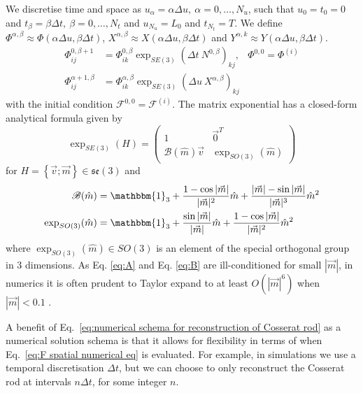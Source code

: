 \documentclass[withindex,glossary,techreport]{cam-thesis}
\begin{document}
\begin{appendices}
We discretise time and space as $u_{\alpha}=\alpha\Delta u,\ \alpha=0,\dots,N_{u}$, such that $u_{0}=t_{0}=0$ and $t_{\beta}=\beta\Delta t,\ \beta=0,\dots,N_{t}$
and $u_{N_{u}}=L_{0}$ and $t_{N_{t}}=T$. We define $\Phi^{\alpha,\beta}\approx \Phi(\alpha\Delta u,\beta\Delta t)$,
$X^{\alpha,\beta}\approx X(\alpha\Delta u,\beta\Delta t)$ and $Y^{\alpha,k}\approx Y(\alpha\Delta u,\beta\Delta t)$.
\begin{subequations} \label{eq:numerical schema for reconstruction of Cosserat rod}
\begin{align}
\Phi_{ij}^{0, \beta+1} & = \Phi_{ik}^{0, \beta} \exp_{SE(3)} \left(\Delta t\ N^{0, \beta}\right)_{kj}, & \Phi^{0,0}=\Phi^{(i)}\\
\Phi_{ij}^{\alpha+1, \beta} & = \Phi_{ik}^{\alpha, \beta}\exp_{SE(3)}  \left(\Delta u\ X^{\alpha,\beta}\right)_{kj} \label{eq:F spatial numerical eq}
\end{align}
\end{subequations}
with the initial condition $\mathcal{F}^{0,0}=\mathcal{F}^{(i)}$.
The matrix exponential has a closed-form analytical formula given
by
\begin{equation}
\exp_{SE(3)}  (H)=\left(\begin{array}{cc}
1 & \vec{0}^{T}\\
\mathscr{B}(\hat{m}) \vec{v} & \exp_{SO(3)}(\hat{m})
\end{array}\right)
\end{equation}
for $H=\left\{ \vec{v};\vec{m}\right\} \in\mathfrak{se}(3)$ and
\begin{subequations} 
\begin{align}
\mathscr{B}(\hat{m}) & =\mathbbm{1}_{3}+\frac{1-\cos|\vec{m}|}{|\vec{m}|^{2}}\hat{m}+\frac{|\vec{m}|-\sin|\vec{m}|}{|\vec{m}|^{3}}\hat{m}^{2}\label{eq:A}\\
\exp_{SO(3)} (\hat{m}) & =\mathbbm{1}_{3}+\frac{\sin|\vec{m}|}{|\vec{m}|}\hat{m}+\frac{1-\cos|\vec{m}|}{|\vec{m}|^{2}}\hat{m}^{2}\label{eq:B}
\end{align}
\end{subequations}
where $\exp_{SO(3)} (\hat{m}) \in SO(3)$ is an element of the special orthogonal
group in 3 dimensions. As Eq. \ref{eq:A} and Eq. \ref{eq:B} are
ill-conditioned for small $|\vec{m}|$, in numerics it is often prudent
to Taylor expand to at least $O(|\vec{m}|^6)$ when $|\vec{m}| < 0.1$ \citep{giusteriSimulationViscoelasticCosserat2021}.

A benefit of Eq.~\ref{eq:numerical schema for reconstruction of Cosserat rod} as a numerical solution schema is that it allows for flexibility in terms of when Eq.~\ref{eq:F spatial numerical eq} is evaluated. For example, in simulations we use a temporal discretisation $\Delta t$, but we can choose to only reconstruct the Cosserat rod at intervals $n \Delta t$, for some integer $n$.


\end{appendices}
\end{document}
